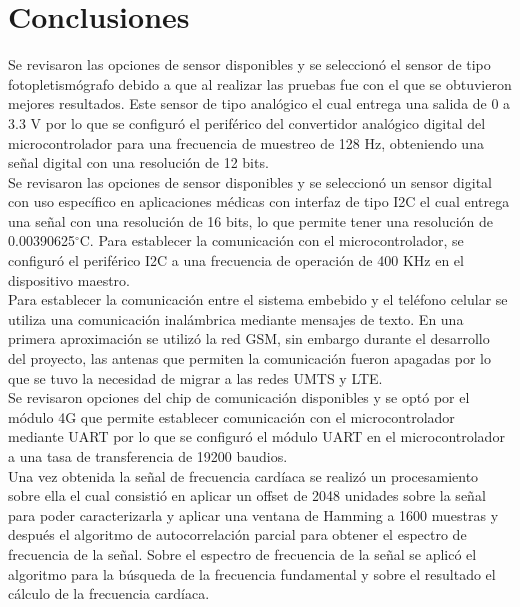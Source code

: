 
\section{Conclusiones}

Se revisaron las opciones de sensor disponibles y se seleccionó el sensor de tipo fotopletismógrafo debido a que al realizar las pruebas fue con el que se obtuvieron mejores resultados. Este sensor de tipo analógico el cual entrega una salida de 0 a 3.3 V por lo que se configuró el periférico del convertidor analógico digital del microcontrolador para una frecuencia de muestreo de 128 Hz, obteniendo una señal digital con una resolución de 12 bits.\\

Se revisaron las opciones de sensor disponibles y se seleccionó un sensor digital con uso específico en aplicaciones médicas con interfaz de tipo I2C el cual entrega una señal con una resolución de 16 bits, lo que permite tener una resolución de 0.00390625$^{\circ}$C. Para establecer la comunicación con el microcontrolador, se configuró el periférico I2C a una frecuencia de operación de 400 KHz en el dispositivo maestro.\\

Para establecer la comunicación entre el sistema embebido y el teléfono celular se utiliza una comunicación inalámbrica mediante mensajes de texto. En una primera aproximación se utilizó la red GSM, sin embargo durante el desarrollo del proyecto, las antenas que permiten la comunicación fueron apagadas por lo que se tuvo la necesidad de migrar a las redes UMTS y LTE.\\

Se revisaron opciones del chip de comunicación disponibles y se optó por el módulo 4G que permite establecer comunicación con el microcontrolador mediante UART por lo que se configuró el módulo UART en el microcontrolador a una tasa de transferencia de 19200 baudios.\\

Una vez obtenida la señal de frecuencia cardíaca se realizó un procesamiento sobre ella el cual consistió en aplicar un offset de 2048 unidades sobre la señal para poder caracterizarla y aplicar una ventana de Hamming a 1600 muestras y después el algoritmo de autocorrelación parcial para obtener el espectro de frecuencia de la señal. Sobre el espectro de frecuencia de la señal se aplicó el algoritmo para la búsqueda de la frecuencia fundamental y sobre el resultado el cálculo de la frecuencia cardíaca.\\

